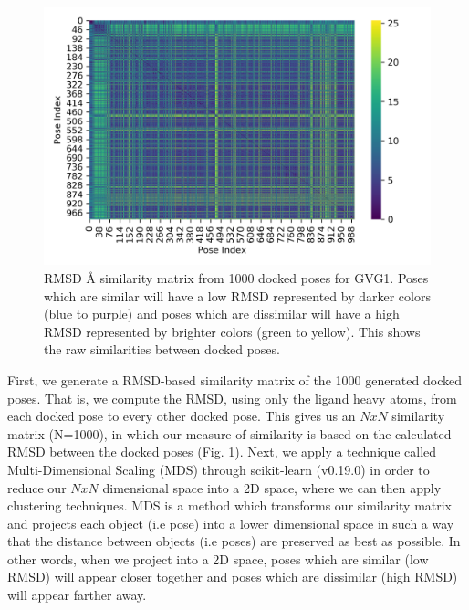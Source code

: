 \begin{figure}
    \centering
    \includegraphics{chapter6/Figures/GVG_1-rmsd_matrix.png}
    \caption[RMSD Similarity Matrix]{RMSD {\AA} similarity matrix from 1000 docked poses for GVG1. Poses which are similar will have a low RMSD represented by darker colors (blue to purple) and poses which are dissimilar will have a high RMSD represented by brighter colors (green to yellow). This shows the raw similarities between docked poses.}
    \label{fig:similarity_matrix}
\end{figure}

First, we generate a RMSD-based similarity matrix of the 1000 generated docked poses.
That is, we compute the RMSD, using only the ligand heavy atoms, from each docked pose to every other docked pose.
This gives us an $N x N$ similarity matrix (N=1000), in which our measure of similarity is based on the calculated RMSD between the docked poses (Fig. \ref{fig:similarity_matrix}).
Next, we apply a technique called Multi-Dimensional Scaling (MDS) through scikit-learn (v0.19.0) \cite{scikit_mds} in order to reduce our $N x N$ dimensional space into a 2D space, where we can then apply clustering techniques.
MDS is a method which transforms our similarity matrix and projects each object (i.e pose) into a lower dimensional space in such a way that the distance between objects (i.e poses) are preserved as best as possible.
In other words, when we project into a 2D space, poses which are similar (low RMSD) will appear closer together and poses which are dissimilar (high RMSD) will appear farther away.

